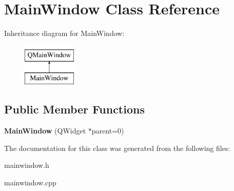 \hypertarget{class_main_window}{}\section{Main\+Window Class Reference}
\label{class_main_window}
Inheritance diagram for Main\+Window\+:\begin{figure}[H]
\begin{center}
\leavevmode
\includegraphics[height=2.000000cm]{class_main_window}
\end{center}
\end{figure}
\subsection*{Public Member Functions}
\begin{DoxyCompactItemize}
\item 
{\bfseries Main\+Window} (Q\+Widget $\ast$parent=0)\hypertarget{class_main_window_a8b244be8b7b7db1b08de2a2acb9409db}{}\label{class_main_window_a8b244be8b7b7db1b08de2a2acb9409db}

\end{DoxyCompactItemize}


The documentation for this class was generated from the following files\+:\begin{DoxyCompactItemize}
\item 
mainwindow.\+h\item 
mainwindow.\+cpp\end{DoxyCompactItemize}
